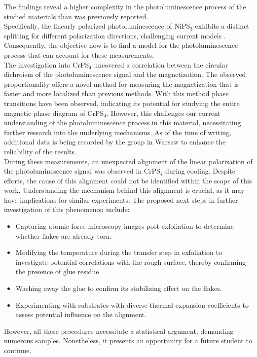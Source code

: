 \documentclass[
	twoside,
	parskip=half,
	a4paper,
]{scrbook}
\begin{document}
The findings reveal a higher complexity in the photoluminescence process of the studied materials than was previously reported.\\
Specifically, the linearly polarized photoluminescence of NiPS$_3$ exhibits a distinct splitting for different polarization directions, challenging current models \cite{NiPS3_magnon_gap,NiPS3_linear,NiPS3_coherent}.
Consequently, the objective now is to find a model for the photoluminescence process that can account for these measurements.\\
The investigation into CrPS$_4$ uncovered a correlation between the circular dichroism of the photoluminescence signal and the magnetization.
The observed proportionality offers a novel method for measuring the magnetization that is faster and more localized than previous methods.
With this method phase transitions have been observed, indicating its potential for studying the entire magnetic phase diagram of CrPS$_4$.
However, this challenges our current understanding of the photoluminescence process in this material, necessitating further research into the underlying mechanisms.
As of the time of writing, additional data is being recorded by the group in Warsaw to enhance the reliability of the results.\\
During these measurements, an unexpected alignment of the linear polarization of the photoluminescence signal was observed in CrPS$_4$ during cooling.
Despite efforts, the cause of this alignment could not be identified within the scope of this work.
Understanding the mechanism behind this alignment is crucial, as it may have implications for similar experiments.
The proposed next steps in further investigation of this phenomenon include:
\begin{itemize}
	\setlength\itemsep{-0.5em}
	\item Capturing atomic force microscopy images post-exfoliation to determine whether flakes are already torn.
	\item Modifying the temperature during the transfer step in exfoliation to investigate potential correlations with the rough surface, thereby confirming the presence of glue residue.
	\item Washing away the glue to confirm its stabilizing effect on the flakes.
	\item Experimenting with substrates with diverse thermal expansion coefficients to assess potential influence on the alignment.
\end{itemize}
However, all these procedures necessitate a statistical argument, demanding numerous samples. 
Nonetheless, it presents an opportunity for a future student to continue.
\end{document}
